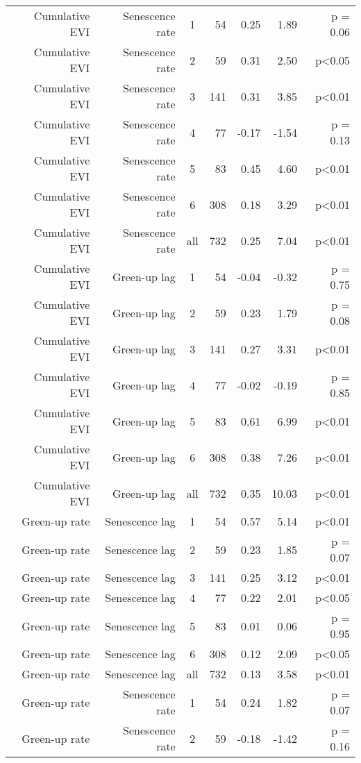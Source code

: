 \begin{table}[H]
\begin{tabular}{rrcrrrr}
   \hline
Cumulative EVI & Senescence rate & 1 &  54 & 0.25 & 1.89 & p = 0.06 \\ 
  Cumulative EVI & Senescence rate & 2 &  59 & 0.31 & 2.50 & p<0.05 \\ 
  Cumulative EVI & Senescence rate & 3 & 141 & 0.31 & 3.85 & p<0.01 \\ 
  Cumulative EVI & Senescence rate & 4 &  77 & -0.17 & -1.54 & p = 0.13 \\ 
  Cumulative EVI & Senescence rate & 5 &  83 & 0.45 & 4.60 & p<0.01 \\ 
  Cumulative EVI & Senescence rate & 6 & 308 & 0.18 & 3.29 & p<0.01 \\ 
  Cumulative EVI & Senescence rate & all & 732 & 0.25 & 7.04 & p<0.01 \\ 
   \hline
Cumulative EVI & Green-up lag & 1 &  54 & -0.04 & -0.32 & p = 0.75 \\ 
  Cumulative EVI & Green-up lag & 2 &  59 & 0.23 & 1.79 & p = 0.08 \\ 
  Cumulative EVI & Green-up lag & 3 & 141 & 0.27 & 3.31 & p<0.01 \\ 
  Cumulative EVI & Green-up lag & 4 &  77 & -0.02 & -0.19 & p = 0.85 \\ 
  Cumulative EVI & Green-up lag & 5 &  83 & 0.61 & 6.99 & p<0.01 \\ 
  Cumulative EVI & Green-up lag & 6 & 308 & 0.38 & 7.26 & p<0.01 \\ 
  Cumulative EVI & Green-up lag & all & 732 & 0.35 & 10.03 & p<0.01 \\ 
   \hline
Green-up rate & Senescence lag & 1 &  54 & 0.57 & 5.14 & p<0.01 \\ 
  Green-up rate & Senescence lag & 2 &  59 & 0.23 & 1.85 & p = 0.07 \\ 
  Green-up rate & Senescence lag & 3 & 141 & 0.25 & 3.12 & p<0.01 \\ 
  Green-up rate & Senescence lag & 4 &  77 & 0.22 & 2.01 & p<0.05 \\ 
  Green-up rate & Senescence lag & 5 &  83 & 0.01 & 0.06 & p = 0.95 \\ 
  Green-up rate & Senescence lag & 6 & 308 & 0.12 & 2.09 & p<0.05 \\ 
  Green-up rate & Senescence lag & all & 732 & 0.13 & 3.58 & p<0.01 \\ 
   \hline
Green-up rate & Senescence rate & 1 &  54 & 0.24 & 1.82 & p = 0.07 \\ 
  Green-up rate & Senescence rate & 2 &  59 & -0.18 & -1.42 & p = 0.16 \\ 

\end{tabular}
\end{table}
